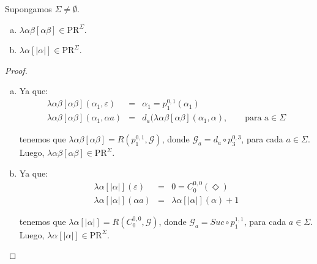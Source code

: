   \begin{lemma}
    \par Supongamos $\Sigma \neq \emptyset$.

    \begin{enumerate}[a)]
      \item $\lambda \alpha \beta \left[\alpha\beta\right] \in \mathrm{PR}^{\Sigma}$.
      \item $\lambda \alpha \left[\lvert\alpha \rvert\right] \in \mathrm{PR}^{\Sigma}$.
    \end{enumerate}
  \end{lemma}
  \begin{proof}
    \begin{enumerate}[a)]
      \item Ya que:
        \begin{eqnarray}
          \nonumber \lambda \alpha\beta \left[\alpha \beta\right](\alpha_{1}, \varepsilon) &=& \alpha_{1} =
          p_{1}^{0,1}(\alpha_{1}) \\
          \nonumber \lambda \alpha\beta \left[\alpha \beta\right](\alpha_{1}, \alpha a) &=& d_{a}(\lambda \alpha\beta
          \left[\alpha\beta\right](\alpha_{1}, \alpha), \qquad \text{para a} \in \Sigma
        \end{eqnarray}

        \par tenemos que $\lambda \alpha\beta \left[\alpha \beta\right] = R(p_{1}^{0, 1}, \mathcal{G})$, donde
        $\mathcal{G}_{a} = d_{a} \circ p_{3}^{0,3}$, para cada $a \in \Sigma$. Luego, $\lambda \alpha\beta
        \left[\alpha\beta\right] \in \mathrm{PR}^{\Sigma}$.
      \item Ya que:
        \begin{eqnarray}
          \nonumber \lambda \alpha \left[\lvert\alpha \rvert\right](\varepsilon) &=& 0 = C_{0}^{0,0}(\Diamond) \\
          \nonumber \lambda \alpha \left[\lvert\alpha \rvert\right](\alpha a) &=& \lambda \alpha \left[\lvert\alpha
            \rvert\right](\alpha) + 1
        \end{eqnarray}

        \par tenemos que $\lambda \alpha \left[\lvert\alpha \rvert\right] = R(C_{0}^{0, 0}, \mathcal{G})$, donde
        $\mathcal{G}_{a} = Suc \circ p_{1}^{1, 1}$, para cada $a \in \Sigma$. Luego, $\lambda \alpha
        \left[\lvert\alpha \rvert\right] \in \mathrm{PR}^{\Sigma}$.
    \end{enumerate}
  \end{proof}

